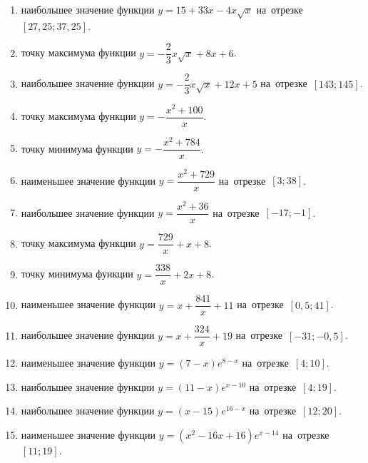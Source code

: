 \documentclass[a4paper,10pt]{article}
\begin{document}
\begin{enumerate}
\item {} наибольшее значение функции $y=15+33x -4x\sqrt{x}$ на~отрезке~$\left[27,25;37,25\right]$.

\item {} точку максимума функции $y=-\dfrac{2}{3}x\sqrt{x} +8x+6$.

\item {} наибольшее значение функции $y=-\dfrac{2}{3}x\sqrt{x} +12x+5$ на~отрезке~$\left[143;145\right]$.

\item {} точку максимума функции $y=-\dfrac{x^2 +100}{x}$.

\item {} точку минимума функции $y=-\dfrac{x^2 +784}{x}$.

\item {} наименьшее значение функции $y=\dfrac{x^2 +729}{x}$ на~отрезке~$\left[3;38\right]$.

\item {} наибольшее значение функции $y=\dfrac{x^2 +36}{x}$ на~отрезке~$\left[-17;-1\right]$.

\item {} точку максимума функции $y=\dfrac{729}{x} +x+8$.

\item {} точку минимума функции $y=\dfrac{338}{x} +2x+8$.

\item {} наименьшее значение функции $y=x+\dfrac{841}{x} +11$ на~отрезке~$\left[0,5;41\right]$.

\item {} наибольшее значение функции $y=x+\dfrac{324}{x} +19$ на~отрезке~$\left[-31;-0,5\right]$.

\item {} наименьшее значение функции $y=\left(7-x\right)e^{8-x}$ на~отрезке~$\left[4;10\right]$.

\item {} наибольшее значение функции $y=\left(11-x\right)e^{x-10}$ на~отрезке~$\left[4;19\right]$.

\item {} наибольшее значение функции $y=\left(x-15\right)e^{16-x}$ на~отрезке~$\left[12;20\right]$.

\item {} наименьшее значение функции $y=\left(x^2 -16x +16\right)e^{x -14}$ на~отрезке~$\left[11;19\right]$.


\end{enumerate}
\end{document}
